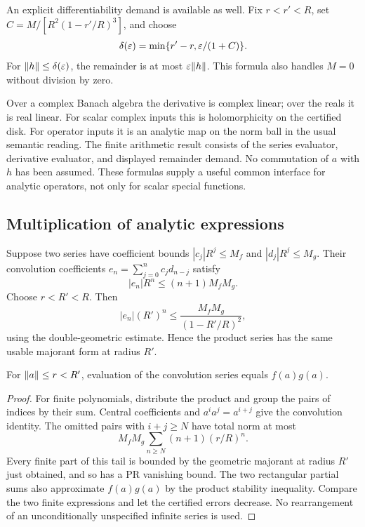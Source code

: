 An explicit differentiability demand is available as well. Fix $r<r'<R$, set $C=M/[R^2(1-r'/R)^3]$, and choose
\[
 \delta(\varepsilon)=\min\{r'-r,\varepsilon/(1+C)\}.
\]
For $\lVert h\rVert\le\delta(\varepsilon)$, the remainder is at most $\varepsilon\lVert h\rVert$. This formula also handles $M=0$ without division by zero.

Over a complex Banach algebra the derivative is complex linear; over the reals it is real linear. For scalar complex inputs this is holomorphicity on the certified disk. For operator inputs it is an analytic map on the norm ball in the usual semantic reading. The finite arithmetic result consists of the series evaluator, derivative evaluator, and displayed remainder demand. No commutation of $a$ with $h$ has been assumed. These formulas supply a useful common interface for analytic operators, not only for scalar special functions.

\subsection{Multiplication of analytic expressions}

Suppose two series have coefficient bounds $|c_j|R^j\le M_f$ and $|d_j|R^j\le M_g$. Their convolution coefficients
$e_n=\sum_{j=0}^n c_jd_{n-j}$ satisfy
\[
 |e_n|R^n\le(n+1)M_fM_g.
\]
Choose $r<R'<R$. Then
\[
 |e_n|(R')^n\le\frac{M_fM_g}{(1-R'/R)^2},
\]
using the double-geometric estimate. Hence the product series has the same usable majorant form at radius $R'$.

\begin{proposition}\label{prop:product-calculus}
For $\lVert a\rVert\le r<R'$, evaluation of the convolution series equals $f(a)g(a)$.
\end{proposition}
\begin{proof}
For finite polynomials, distribute the product and group the pairs of indices by their sum. Central coefficients and $a^ia^j=a^{i+j}$ give the convolution identity. The omitted pairs with $i+j\ge N$ have total norm at most
\[
 M_fM_g\sum_{n\ge N}(n+1)(r/R)^n.
\]
Every finite part of this tail is bounded by the geometric majorant at radius $R'$ just obtained, and so has a PR vanishing bound. The two rectangular partial sums also approximate $f(a)g(a)$ by the product stability inequality. Compare the two finite expressions and let the certified errors decrease. No rearrangement of an unconditionally unspecified infinite series is used.
\end{proof}

